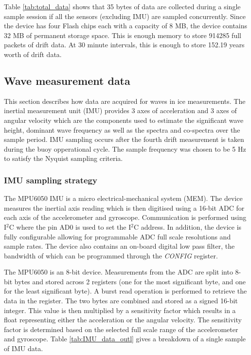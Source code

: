 Table \ref{tab:total_data} shows that 35 bytes of data are collected during a single sample session if all the sensors (excluding IMU) are sampled concurrently. Since the device has four Flash chips each with a capacity of 8 MB, the device contains 32 MB of permanent storage space. This is enough memory to store 914285 full packets of drift data. At 30 minute intervals, this is enough to store 152.19 years worth of drift data. 
\subsection{Wave measurement data}

This section describes how data are acquired for waves in ice measurements. The inertial measurement unit (IMU) provides 3 axes of acceleration and 3 axes of angular velocity which are the components used to estimate the significant wave height, dominant wave frequency as well as the spectra and co-spectra over the sample period. IMU sampling occurs after the fourth drift measurement is taken during the buoy opperational cycle. The sample frequency was chosen to be 5 Hz to satisfy the Nyquist sampling criteria.\par 

\subsubsection{IMU sampling strategy}

The MPU6050 IMU is a micro electrical-mechanical system (MEM). The device measures the inertial axis reading which is then digitised using a 16-bit ADC for each axis of the accelerometer and gyroscope. Communication is performed using I$^2$C where the pin AD0 is used to set the I$^2$C address. In addition, the device is fully configurable allowing for programmable ADC full scale resolutions and sample rates. The device also contains an on-board digital low pass filter, the bandwidth of which can be programmed through the \textit{CONFIG} register.\par 

The MPU6050 is an 8-bit device. Measurements from the ADC are split into 8-bit bytes and stored across 2 registers (one for the most significant byte, and one for the least significant byte). A burst read operation is performed to retrieve the data in the register. The two bytes are combined and stored as a signed 16-bit integer. This value is then multiplied by a sensitivity factor which results in a float representing either the acceleration or the angular velocity. The sensitivity factor is determined based on the selected full scale range of the accelerometer and gyroscope. Table \ref{tab:IMU_data_outl} gives a breakdown of a single sample of IMU data.

